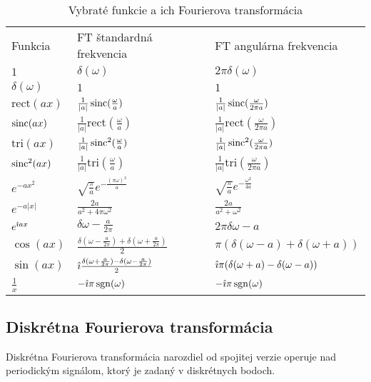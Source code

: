 \begin{table}[htp]
    \centering
    \begin{tabular}{lll}
    Funkcia&FT štandardná frekvencia&FT angulárna frekvencia\\
    $1$&$\delta(\omega)$&$2\pi\delta(\omega)$\\
    $\delta(\omega)$&$1$&$1$\\
    $\text{rect}(ax)$&$\frac{1}{|a|}\operatorname{sinc}(\frac{\omega}{a})$&
               $\frac{1}{|a|}\operatorname{sinc}(\frac{\omega}{2\pi a})$\\
    $\operatorname{sinc}(ax)$&$\frac{1}{|a|}\text{rect}(\frac{\omega}{a})$&
                $\frac{1}{|a|}\text{rect}(\frac{\omega}{2\pi a})$\\
    $\text{tri}(ax)$&$\frac{1}{|a|}\operatorname{sinc}^2(\frac{\omega}{a})$&
               $\frac{1}{|a|}\operatorname{sinc}^2(\frac{\omega}{2\pi a})$\\
    $\operatorname{sinc}^2(ax)$&$\frac{1}{|a|}\text{tri}(\frac{\omega}{a})$&
                $\frac{1}{|a|}\text{tri}(\frac{\omega}{2\pi a})$\\
    $e^{-ax^2}$&$\sqrt{\frac{\pi}{a}} e^{-\frac{(\pi\omega)^2}{a}}$&
                $\sqrt{\frac{\pi}{a}} e^{-\frac{\omega^2}{4a}}$\\
    $e^{-a|x|}$& $\frac{2a}{a^2 + 4\pi\omega^2}$&
                 $\frac{2a}{a^2 + \omega^2}$\\
    $e^{\hat{\imath} a x}$&$\delta{\omega-\frac{a}{2\pi}}$&
                 $2\pi\delta{\omega-a}$\\
    $\cos(ax)$&$\frac{\delta(\omega-\frac{a}{2\pi})+
                      \delta(\omega+\frac{a}{2\pi})}{2}$&
                $\pi (\delta(\omega-a)+\delta(\omega+a))$\\
    $\sin(ax)$&$\hat{\imath}\frac{\delta(\omega+\frac{a}{2\pi})-
                      \delta(\omega-\frac{a}{2\pi})}{2}$&
                $\hat{\imath}\pi (\delta(\omega+a)-\delta(\omega-a))$\\
    $\frac{1}{x}$&$-\hat{\imath}\pi\operatorname{sgn}(\omega)$&
                  $-\hat{\imath}\pi\operatorname{sgn}(\omega)$
    \end{tabular}
    \caption{Vybraté funkcie a ich Fourierova transformácia}
    \label{tab:fourier_transform_pairs}
\end{table}

\subsection{Diskrétna Fourierova transformácia}

Diskrétna Fourierova transformácia narozdiel od spojitej verzie operuje nad
periodickým signálom, ktorý je zadaný v diskrétnych bodoch.

